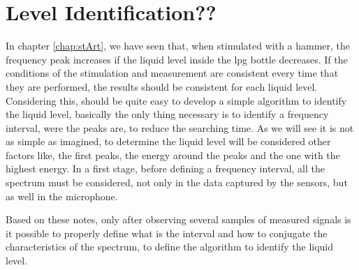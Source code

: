 \section{Level Identification??}
In chapter \ref{chap:stArt}, we have seen that, when stimulated with a hammer, the frequency peak increases if the liquid level inside the \acrshort{lpg} bottle decreases. If the conditions of the stimulation and measurement are consistent every time that they are performed, the results should be consistent for each liquid level. Considering this, should be quite easy to develop a simple algorithm to identify the liquid level, basically the only thing necessary is to identify a frequency interval, were the peaks are, to reduce the searching time. As we will see it is not as simple as imagined, to determine the liquid level will be considered other factors like, the first peaks, the energy around the peaks and the one with the highest energy. In a first stage, before defining a frequency interval, all the spectrum must be considered, not only in the data captured by the sensors, but as well in the microphone.

Based on these notes, only after observing several samples of measured signals is it possible to properly define what is the interval and how to conjugate the characteristics of the spectrum, to define the algorithm to identify the liquid level. 
